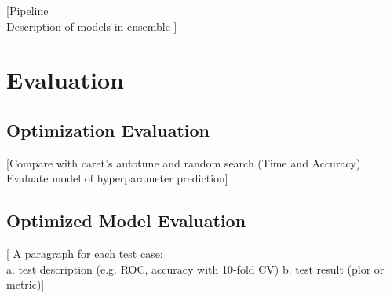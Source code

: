 \documentclass[]{article}
\numberwithin{equation}{section}		%
\numberwithin{figure}{section}			%
\numberwithin{table}{section}				%
\begin{document}
	[Pipeline \\
	Description of models in ensemble
	]
	\section{Evaluation}
	\subsection{Optimization Evaluation}
	
	[Compare with caret's autotune and random search (Time and Accuracy) \\
	Evaluate model of hyperparameter prediction]
	
	
	\subsection{Optimized Model Evaluation}
	[ A paragraph for each test case:\\
	  a. test description (e.g. ROC, accuracy with 10-fold CV)
	  b. test result (plor or metric)]
	
\end{document}
